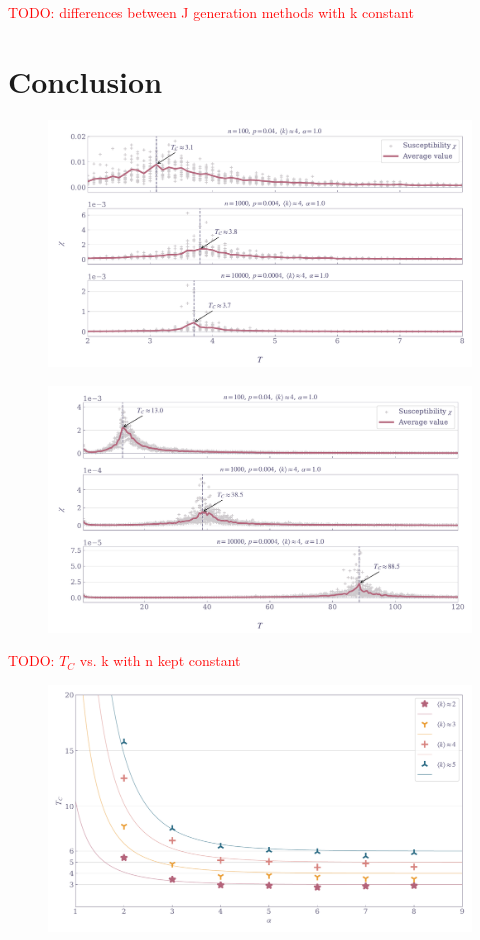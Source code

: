 \documentclass[11pt,a4paper]{article}
\newcommand{\todo}[1]{\textcolor{red}{TODO: #1}}
\begin{document}
\todo{differences between J generation methods with k constant}

\section{Conclusion}

\begin{figure}[ht!]
    \includegraphics[width=\linewidth]{../figures/suscept_ER_nearest.pdf}
\end{figure}


\begin{figure}[ht!]
    \includegraphics[width=\linewidth]{../figures/suscept_ER_single.pdf}
\end{figure}

\todo{$T_C$ vs. k with n kept constant}
\begin{figure}[ht!]
    \includegraphics[width=\linewidth]{../figures/TC_vs_alpha.pdf}
\end{figure}
\end{document}

